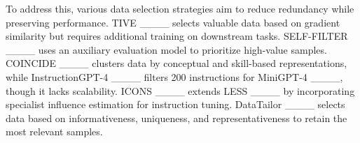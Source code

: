 \noindent To address this, various data selection strategies aim to reduce redundancy while preserving performance. TIVE ____ selects valuable data based on gradient similarity but requires additional training on downstream tasks. SELF-FILTER ____ uses an auxiliary evaluation model to prioritize high-value samples. COINCIDE ____ clusters data by conceptual and skill-based representations, while InstructionGPT-4 ____ filters 200 instructions for MiniGPT-4 ____, though it lacks scalability. ICONS ____ extends LESS ____ by incorporating specialist influence estimation for instruction tuning. DataTailor ____ selects data based on informativeness, uniqueness, and representativeness to retain the most relevant samples.